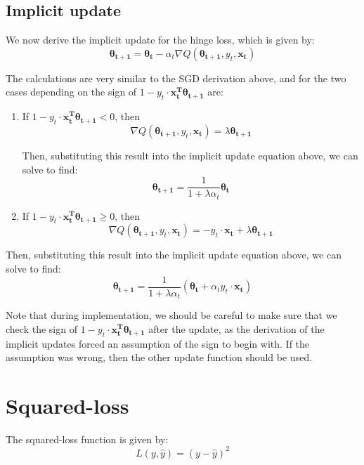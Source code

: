 \documentclass{article}
\renewcommand{\vec}[1]{\boldsymbol{#1}}
\begin{document}
\subsection{Implicit update}
We now derive the implicit update for the hinge loss, which is given by:
\begin{equation}
\vec{\theta_{t+1}} = \vec{\theta_{t}} - \alpha_{t}\nabla Q(\vec{\theta_{t+1}}, y_t, \vec{x_t})
\end{equation}

The calculations are very similar to the SGD derivation above, and for the two cases depending on the sign of $1-y_t\cdot\vec{x_t^{T}}\vec{\theta_{t+1}}$ are:

\begin{enumerate}
\item If $1-y_t\cdot\vec{x_t^{T}}\vec{\theta_{t+1}} < 0$, then
\begin{equation*}
\nabla Q(\vec{\theta_{t+1}}, y_t, \vec{x_t}) = \lambda\vec{\theta_{t+1}}
\end{equation*}

Then, substituting this result into the implicit update equation above, we can solve to find:
\begin{equation}
\vec{\theta_{t+1}} = \frac{1}{1+\lambda\alpha_t}\vec{\theta_t}
\end{equation}

\item If $1-y_t\cdot\vec{x_t^{T}}\vec{\theta_{t+1}} \geq 0$, then 
\begin{equation*}
\nabla Q(\vec{\theta_{t+1}}, y_t, \vec{x_t}) = -y_t\cdot\vec{x_t} + \lambda\vec{\theta_{t+1}}
\end{equation*}
\end{enumerate}

Then, substituting this result into the implicit update equation above, we can solve to find:
\begin{equation}
\vec{\theta_{t+1}} = \frac{1}{1+\lambda\alpha_t}\left(\vec{\theta_t} + \alpha_t y_t\cdot\vec{x_t}\right)
\end{equation}

Note that during implementation, we should be careful to make sure that we check the sign of $1-y_t\cdot\vec{x_t^{T}}\vec{\theta_{t+1}}$ after the update, as the derivation of the implicit updates forced an assumption of the sign to begin with. If the assumption was wrong, then the other update function should be used.

\section{Squared-loss}
The squared-loss function is given by:
\begin{equation}
L(y, \hat{y}) = (y-\hat{y})^2
\end{equation}
\end{document}
